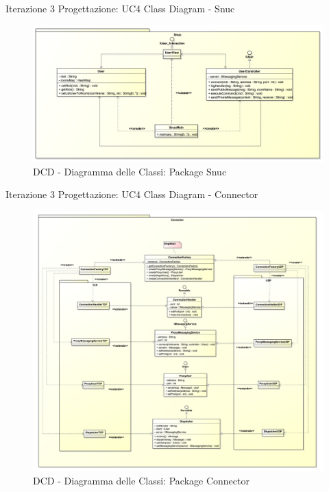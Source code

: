 \documentclass[t]{beamer} %
\begin{document}
\begin{frame} {Iterazione 3 Progettazione: UC4 Class Diagram - Snuc}
   \begin{figure}
     \includegraphics[scale=0.235]{image_astah/Iteration_3_DesignModel/ClassDiagramSnuc.png}{\centering}
     \caption{DCD - Diagramma delle Classi: Package Snuc }
     \label{fig_UC4_DCD_3} 
   \end{figure}
\end{frame}

\begin{frame} {Iterazione 3 Progettazione: UC4 Class Diagram - Connector}
   \begin{figure}
     \includegraphics[scale=0.125]{image_astah/Iteration_3_DesignModel/ClassDiagramConnector.png}{\centering}
     \caption{DCD - Diagramma delle Classi: Package Connector }
     \label{fig_UC4_DCD_4} 
   \end{figure}
\end{frame}
\end{document}

